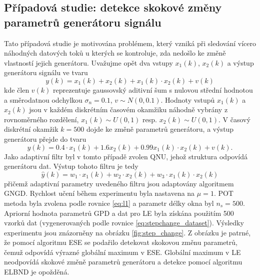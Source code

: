 \subsection{Případová studie: detekce skokové změny parametrů generátoru signálu}\label{chap:stepchange}
Tato případová studie je motivována problémem, který vzniká při sledování vícero náhodných datových toků \cite{stepchange} u kterých se kontroluje, zda nedošlo ke změně vlastností jejich generátoru. Uvažujme opět dva vstupy $x_1(k)$, $x_2(k)$ a výstup generátoru signálu ve tvaru
\begin{equation}
y(k)=x_1(k)+x_2(k)+x_1(k)\cdot x_2(k) + v(k)
\end{equation} 
kde člen $v(k)$ reprezentuje gaussovský aditivní šum s nulovou střední hodnotou a směrodatnou odchylkou $\sigma_n=0.1$, $v \sim N(0,0.1)$. Hodnoty vstupů $x_1(k)$ a $x_2(k)$ jsou v každém diskrétním časovém okamžiku náhodně vybrány z rovnoměrného rozdělení, $x_1(k) \sim U(0,1)$ resp. $x_2(k) \sim U(0,1)$. V časový diskrétní okamžik $k=500$ dojde ke změně parametrů generátoru, a výstup generátoru přejde do tvaru
\begin{equation}\label{eq:stepchange_dataset}
y(k)=0.4\cdot x_1(k) + 1.6x_2(k)+0.99x_1(k)\cdot x_2(k) + v(k).
\end{equation}
Jako adaptivní filtr byl v tomto případě zvolen QNU, jehož struktura odpovídá generátoru dat. Výstup tohoto filtru je tedy
\begin{equation}
\hat{y}(k)=w_1\cdot x_1(k)+w_2\cdot x_2(k)+w_3\cdot x_1(k)\cdot x_2(k)
\end{equation}
přičemž adaptivní parametry uvedeného filtru jsou adaptovány algoritmem GNGD. Rychlost učení během experimentu byla nastavena na $\mu=1$. POT metoda byla zvolena podle rovnice \ref{eq:l1} a parametr délky okna byl $n_s=500$. Apriorní hodnota parametrů GPD a dat pro LE byla získána použitím 500 vzorků dat (vygenerovaných podle rovnice \ref{eq:stepchange_dataset}). Výsledky experimentu jsou znázorněny na obrázku \ref{fig:step_change}. Z obrázku je patrné, že pomocí algoritmu ESE se podařilo detekovat skokovou změnu parametrů, čemuž odpovídá výrazné globální maximum v ESE. Globální maximum v LE neodpovídá skokové změně parametrů generátoru a detekce pomocí algoritmu ELBND je opožděná.

